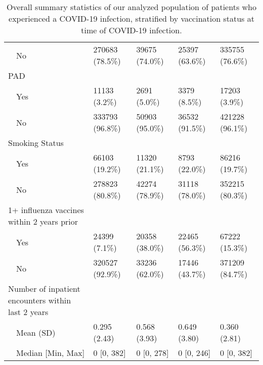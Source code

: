 \begin{table}[!htbp]
\begin{tabular}{lllll}
    No & 270683 (78.5\%) & 39675 (74.0\%) & 25397 (63.6\%) & 335755 (76.6\%) \\ 
  PAD &  &  &  &  \\ 
    Yes & 11133 (3.2\%) & 2691 (5.0\%) & 3379 (8.5\%) & 17203 (3.9\%) \\ 
    No & 333793 (96.8\%) & 50903 (95.0\%) & 36532 (91.5\%) & 421228 (96.1\%) \\ 
  Smoking Status &  &  &  &  \\ 
    Yes & 66103 (19.2\%) & 11320 (21.1\%) & 8793 (22.0\%) & 86216 (19.7\%) \\ 
    No & 278823 (80.8\%) & 42274 (78.9\%) & 31118 (78.0\%) & 352215 (80.3\%) \\ 
  1+ influenza vaccines within 2 years prior &  &  &  &  \\ 
    Yes & 24399 (7.1\%) & 20358 (38.0\%) & 22465 (56.3\%) & 67222 (15.3\%) \\ 
    No & 320527 (92.9\%) & 33236 (62.0\%) & 17446 (43.7\%) & 371209 (84.7\%) \\ 
  Number of inpatient encounters within last 2 years &  &  &  &  \\ 
    Mean (SD) & 0.295 (2.43) & 0.568 (3.93) & 0.649 (3.80) & 0.360 (2.81) \\ 
    Median [Min, Max] & 0 [0, 382] & 0 [0, 278] & 0 [0, 246] & 0 [0, 382] \\ 
   \hline
\end{tabular}
\caption{Overall summary statistics of our analyzed population of patients who experienced a COVID-19 infection, stratified by vaccination status at time of COVID-19 infection.} 
\label{tab:table_1}
\end{table}
